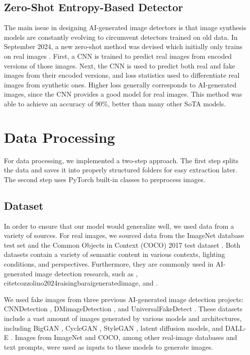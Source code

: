 \documentclass{article} %
\begin{document}
\subsection{Zero-Shot Entropy-Based Detector}
\label{ZED}

The main issue in designing AI-generated image detectors is that image synthesis models are constantly evolving to circumvent detectors trained on old data. In September 2024, a new zero-shot method was devised which initially only trains on real images \citep{cozzolino2024zeroshotdetectionaigeneratedimages}. First, a CNN is trained to predict real images from encoded versions of those images. Next, the CNN is used to predict both real and fake images from their encoded versions, and loss statistics used to differentiate real images from synthetic ones. Higher loss generally corresponds to AI-generated images, since the CNN provides a good model for real images. This method was able to achieve an accuracy of 90\%, better than many other SoTA models.

\section{Data Processing}

For data processing, we implemented a two-step approach. The first step splits the data and saves it into properly structured folders for easy extraction later. The second step uses PyTorch built-in classes to preprocess images.
\subsection{Dataset}

In order to ensure that our model would generalize well, we used data from a variety of sources. For real images, we sourced data from the ImageNet database test set \citep{5206848} and the Common Objects in Context (COCO) 2017 test dataset \citep{lin2015microsoft}. Both datasets contain a variety of semantic content in various contexts, lighting conditions, and perspectives. Furthermore, they are commonly used in AI-generated image detection research, such as \citet{cozzolino2024zeroshotdetectionaigeneratedimages}, citet{cozzolino2024raisingbaraigeneratedimage}, and \citet{radford2021learningtransferablevisualmodels}.

We used fake images from three previous AI-generated image detection projects: CNNDetection
\citep{wang2020cnngeneratedimagessurprisinglyeasy}, DMimageDetection \citep{corvi2022detectionsyntheticimagesgenerated}, and UniversalFakeDetect
\citep{ojha2024universalfakeimagedetectors}. These datasets include a vast amount of images generated by various models and architectures, including BigGAN \citep{brock2019largescalegantraining}, CycleGAN \citep{zhu2020unpairedimagetoimagetranslationusing}, StyleGAN \citep{karras2020analyzingimprovingimagequality}, latent diffusion models, and DALL-E \citep{dall-e}. Images from ImageNet and COCO, among other real-image databases and text prompts, were used as inputs to these models to generate images.
\end{document}
